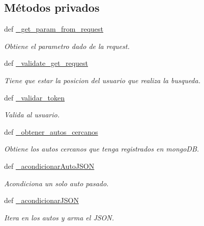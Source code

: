 \subsection*{Métodos privados}
\begin{DoxyCompactItemize}
\item 
def \hyperlink{classsrc_1_1resources_1_1autos_por_posicion_cercana_1_1_autos_por_posicion_cercana_a651a21fe70cdb11ccb7ecddf3a2ef71e}{\-\_\-get\-\_\-param\-\_\-from\-\_\-request}
\begin{DoxyCompactList}\small\item\em Obtiene el parametro dado de la request. \end{DoxyCompactList}\item 
def \hyperlink{classsrc_1_1resources_1_1autos_por_posicion_cercana_1_1_autos_por_posicion_cercana_af31560b90a07c4caf7dcd7f729a97473}{\-\_\-validate\-\_\-get\-\_\-request}
\begin{DoxyCompactList}\small\item\em Tiene que estar la posicion del usuario que realiza la busqueda. \end{DoxyCompactList}\item 
def \hyperlink{classsrc_1_1resources_1_1autos_por_posicion_cercana_1_1_autos_por_posicion_cercana_a071a3bedc7dabbdcfa7a3a2c72ccfb04}{\-\_\-validar\-\_\-token}
\begin{DoxyCompactList}\small\item\em Valida al usuario. \end{DoxyCompactList}\item 
def \hyperlink{classsrc_1_1resources_1_1autos_por_posicion_cercana_1_1_autos_por_posicion_cercana_ae2a7c1697a8d0b5e263a8178f3ad9352}{\-\_\-obtener\-\_\-autos\-\_\-cercanos}
\begin{DoxyCompactList}\small\item\em Obtiene los autos cercanos que tenga registrados en mongo\-D\-B. \end{DoxyCompactList}\item 
def \hyperlink{classsrc_1_1resources_1_1autos_por_posicion_cercana_1_1_autos_por_posicion_cercana_a087e0b7b45211aff9925ce9fdcd368bc}{\-\_\-acondicionar\-Auto\-J\-S\-O\-N}
\begin{DoxyCompactList}\small\item\em Acondiciona un solo auto pasado. \end{DoxyCompactList}\item 
def \hyperlink{classsrc_1_1resources_1_1autos_por_posicion_cercana_1_1_autos_por_posicion_cercana_aa2d6fe08fd52d4fd16b9d6c1831a0d2b}{\-\_\-acondicionar\-J\-S\-O\-N}
\begin{DoxyCompactList}\small\item\em Itera en los autos y arma el J\-S\-O\-N. \end{DoxyCompactList}\end{DoxyCompactItemize}


